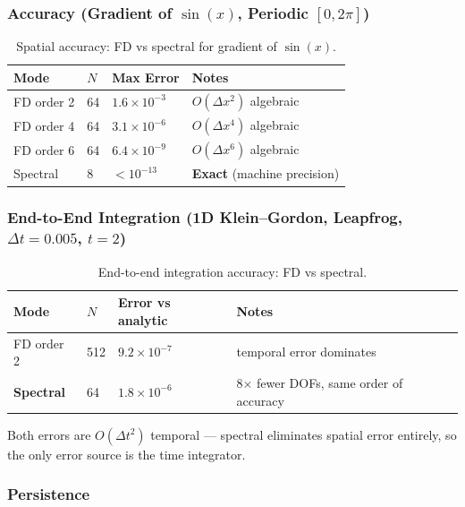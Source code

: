 \subsubsection{Accuracy (Gradient of $\sin(x)$, Periodic $[0, 2\pi]$)}
\label{sec:spectral-accuracy}

\begin{table}[htbp]
\centering
\caption{Spatial accuracy: FD vs spectral for gradient of $\sin(x)$.}
\label{tab:spectral-accuracy}
\begin{tabular}{@{}llll@{}}
\toprule
Mode & $N$ & Max Error & Notes \\
\midrule
FD order 2 & 64 & $1.6 \times 10^{-3}$ & $O(\Delta x^2)$ algebraic \\
FD order 4 & 64 & $3.1 \times 10^{-6}$ & $O(\Delta x^4)$ algebraic \\
FD order 6 & 64 & $6.4 \times 10^{-9}$ & $O(\Delta x^6)$ algebraic \\
Spectral & 8 & $< 10^{-13}$ & \textbf{Exact} (machine precision) \\
\bottomrule
\end{tabular}
\end{table}

\subsubsection{End-to-End Integration (1D Klein--Gordon, Leapfrog, $\Delta t=0.005$, $t=2$)}
\label{sec:spectral-e2e}

\begin{table}[htbp]
\centering
\caption{End-to-end integration accuracy: FD vs spectral.}
\label{tab:spectral-e2e}
\begin{tabular}{@{}llll@{}}
\toprule
Mode & $N$ & Error vs analytic & Notes \\
\midrule
FD order 2 & 512 & $9.2 \times 10^{-7}$ & temporal error dominates \\
\textbf{Spectral} & 64 & $1.8 \times 10^{-6}$ & 8$\times$ fewer DOFs, same order of accuracy \\
\bottomrule
\end{tabular}
\end{table}

Both errors are $O(\Delta t^2)$ temporal --- spectral eliminates spatial error entirely,
so the only error source is the time integrator.

\subsubsection{Persistence}
\label{sec:spectral-persistence}

